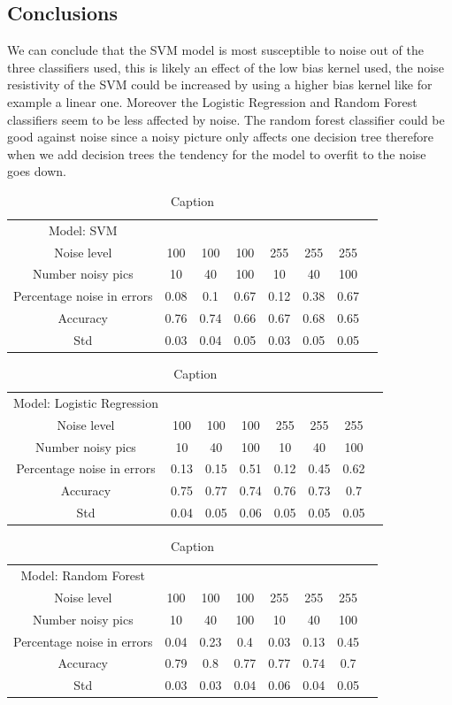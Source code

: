 \documentclass{article}
\begin{document}
\subsection{Conclusions}
We can conclude that the SVM model is most susceptible to noise out of the three classifiers used, this is likely an effect of the low bias kernel used, the noise resistivity of the SVM could be increased by using a higher bias kernel like for example a linear one. Moreover the Logistic Regression and Random Forest classifiers seem to be less affected by noise. The random forest classifier could be good against noise since a noisy picture only affects one decision tree therefore when we add decision trees the tendency for the model to overfit to the noise goes down. 
\begin{table}[H]
    \centering
    \begin{tabular}{c|c|c|c|c|c|c|c}
   Model: SVM \\
    Noise level  & 100 & 100 & 100 & 255 & 255 & 255 \\
       Number noisy pics & 10 & 40 & 100 & 10& 40 & 100 \\
        Percentage noise in errors & 0.08& 0.1 & 0.67 & 0.12& 0.38& 0.67  \\
       Accuracy & 0.76 & 0.74 & 0.66 & 0.67 & 0.68 & 0.65 \\
       Std & 0.03& 0.04 & 0.05 & 0.03 & 0.05 & 0.05\\
    \end{tabular}
    \caption{Caption}
    \label{SVM table}
\end{table}
\begin{table}[H]
\centering
    \begin{tabular}{c|c|c|c|c|c|c|c}
   Model: Logistic Regression \\
    Noise level  & 100 & 100 & 100 & 255 & 255 & 255 \\
       Number noisy pics & 10 & 40 & 100 & 10& 40 & 100 \\
        Percentage noise in errors & 0.13& 0.15 & 0.51 & 0.12 & 0.45& 0.62  \\
       Accuracy & 0.75 & 0.77 & 0.74 & 0.76 & 0.73 & 0.7 \\
       Std & 0.04& 0.05 & 0.06 & 0.05 & 0.05 & 0.05\\
    \end{tabular}
    \caption{Caption}
    \label{LR table}
\end{table}
\begin{table}[H]
\centering
    \begin{tabular}{c|c|c|c|c|c|c|c}
   Model: Random Forest \\
    Noise level  & 100 & 100 & 100 & 255 & 255 & 255 \\
       Number noisy pics & 10 & 40 & 100 & 10& 40 & 100 \\
        Percentage noise in errors & 0.04& 0.23 & 0.4 & 0.03 & 0.13& 0.45\\
       Accuracy & 0.79 & 0.8 & 0.77 & 0.77 & 0.74 & 0.7 \\
       Std & 0.03& 0.03 & 0.04 & 0.06 & 0.04 & 0.05\\
    \end{tabular}
    \caption{Caption}
    \label{RF table}
\end{table}
\end{document}
